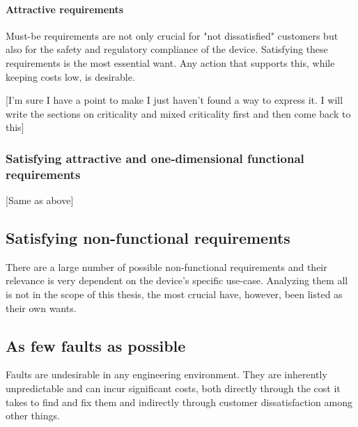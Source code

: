 \paragraph{Attractive requirements} \autocite{ElmarSauerwein.1996}

Must-be requirements are not only crucial for "not dissatisfied" customers but also for the safety and regulatory compliance of the device. Satisfying these requirements is the most essential want. Any action that supports this, while keeping costs low, is desirable.

[I'm sure I have a point to make I just haven't found a way to express it. I will write the sections on criticality and mixed criticality first and then come back to this]

\begin{comment}
In projects that consist purely of software, customer dissatisfaction is the only negative factor. Projects that also require custom hardware have an additional cost. The hardware already needs to implement every functionality and all manufactured devices need to support it. If the feature is then not implemented the hardware costs more without offering the benefits.
\end{comment}

\subsubsection{Satisfying attractive and one-dimensional functional requirements}
[Same as above]

\subsection{Satisfying non-functional requirements}
There are a large number of possible non-functional requirements and their relevance is very dependent on the device's specific use-case. Analyzing them all is not in the scope of this thesis, the most crucial have, however, been listed as their own wants. 


\subsection{As few faults as possible}
Faults are undesirable in any engineering environment. They are inherently unpredictable and can incur significant costs, both directly through the cost it takes to find and fix them and indirectly through customer dissatisfaction among other things.

